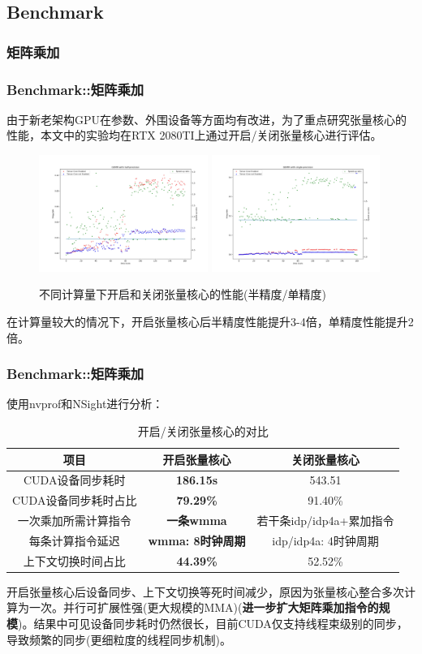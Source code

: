 \documentclass[10pt,aspectratio=169,mathserif]{beamer}
\begin{document}
	\subsection{Benchmark}
	\subsubsection{矩阵乘加}
	\begin{frame}
		\frametitle{Benchmark::矩阵乘加}
		由于新老架构GPU在参数、外围设备等方面均有改进，为了重点研究张量核心的性能，本文中的实验均在RTX 2080TI上通过开启/关闭张量核心进行评估。
		\begin{figure}
			\centering
			\includegraphics[width=5.5cm]{figures/GEMM-Half-TF.jpg}
			\includegraphics[width=5.5cm]{figures/GEMM-Single-TF.jpg}
			\caption{不同计算量下开启和关闭张量核心的性能(半精度/单精度)}\label{Fig.GEMM}
		\end{figure}
		在计算量较大的情况下，开启张量核心后半精度性能提升3-4倍，单精度性能提升2倍。
	\end{frame}
	
	\begin{frame}
		\frametitle{Benchmark::矩阵乘加}
		使用nvprof和NSight进行分析：
		\begin{table}
			\centering
			\caption{开启/关闭张量核心的对比}
			\begin{tabular}{ccc}
				\toprule
				项目	&	开启张量核心 & 关闭张量核心\\
				
				\midrule
				CUDA设备同步耗时 & \textbf{186.15s} & 543.51\\
				CUDA设备同步耗时占比 & \textbf{79.29\%} & 91.40\%\\
				一次乘加所需计算指令 & \textbf{一条wmma} & 若干条idp/idp4a+累加指令\\
				每条计算指令延迟 & \textbf{wmma: 8时钟周期} & idp/idp4a: 4时钟周期\\
				上下文切换时间占比 & \textbf{44.39\%} & 52.52\%\\
				\bottomrule
			\end{tabular}
		\end{table}
		开启张量核心后设备同步、上下文切换等死时间减少，原因为张量核心整合多次计算为一次。并行可扩展性强(更大规模的MMA)(\textbf{进一步扩大矩阵乘加指令的规模})。结果中可见设备同步耗时仍然很长，目前CUDA仅支持线程束级别的同步，导致频繁的同步(更细粒度的线程同步机制)。
	\end{frame}
\end{document}
